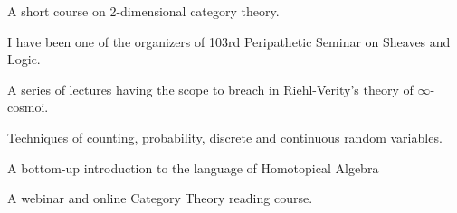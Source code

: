 \begin{eyenumerate}
   \item {}
   {A short course on 2-dimensional category theory.}%
   \item {}
   {I have been one of the organizers of 103rd Peripathetic Seminar on Sheaves and Logic.}%
   \item {}
   {A series of lectures having the scope to breach in Riehl-Verity's theory of $\infty$-cosmoi.}%
   \item {}
   {Techniques of counting, probability, discrete and continuous random variables.}
   \item {}
   {A bottom-up introduction to the language of Homotopical Algebra}%
   \item {}
   {A webinar and online Category Theory reading course.}%
\end{eyenumerate}
